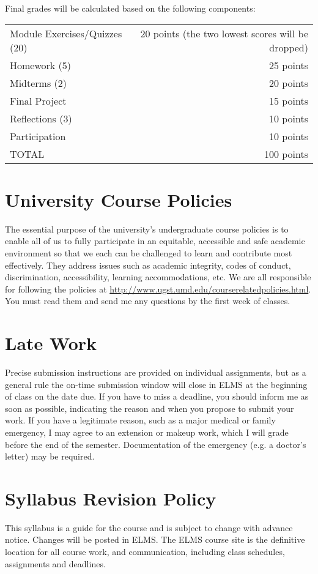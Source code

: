 \documentclass[11pt]{article}
\begin{document}
Final grades will be calculated based on the following components:

\hspace*{.5in}
\begin{tabular}{lr}
	Module Exercises/Quizzes (20) & 20 points (the two lowest scores will be dropped)\\
	Homework (5) & 25 points \\
	Midterms (2) & 20 points \\
	Final Project & 15 points \\
	Reflections (3) & 10 points \\
	Participation & 10 points \\
	\hline
	TOTAL & 100 points \\
\end{tabular}

\section{University Course Policies}
The essential purpose of the university’s undergraduate course policies is to enable all of us to fully participate in an equitable, accessible and safe academic environment so that we each can be challenged to learn and contribute most effectively. They address issues such as academic integrity, codes of conduct, discrimination, accessibility, learning accommodations, etc. We are all responsible for following the policies at \href{http://www.ugst.umd.edu/courserelatedpolicies.html}{http://www.ugst.umd.edu/courserelatedpolicies.html}. You must read them and send me any questions by the first week of classes.

\section{Late Work}
Precise submission instructions are provided on individual assignments, but as a general rule the on-time submission window will close in ELMS at the beginning of class on the date due.  If you have to miss a deadline, you should inform me as soon as possible, indicating the reason and when you propose to submit your work. If you have a legitimate reason, such as a major medical or family emergency, I may agree to an extension or makeup work, which I will grade before the end of the semester. Documentation of the emergency (e.g. a doctor's letter) may be required.

\section{Syllabus Revision Policy}
This syllabus is a guide for the course and is subject to change with advance notice. Changes will be posted in ELMS. The ELMS course site is the definitive location for all course work, and communication, including class schedules, assignments and deadlines.
\newpage
\end{document}
